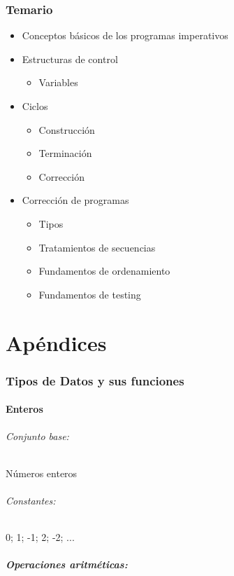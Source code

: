 \section{Temario}
\begin{itemize}
	\item{Conceptos básicos de los programas imperativos}
	\item{Estructuras de control}
	\begin{itemize}
		\item Variables
	\end{itemize}
	\item{Ciclos}
	\begin{itemize}
		\item{Construcción}
		\item{Terminación}
		\item{Corrección}
	\end{itemize}
	\item{Corrección de programas}
	\begin{itemize}
		\item{Tipos}
		\item{Tratamientos de secuencias}
		\item{Fundamentos de ordenamiento}
		\item{Fundamentos de testing} 
	\end{itemize}
\end{itemize}

\newpage
\appendix
\part*{Apéndices}
\section{Tipos de Datos y sus funciones}\label{appendice::datos}
\subsection{Enteros}
\paragraph{Conjunto base:} Números enteros
\paragraph{Constantes:} 0; 1; -1; 2; -2; ...
\subsubsection*{Operaciones aritméticas:}


